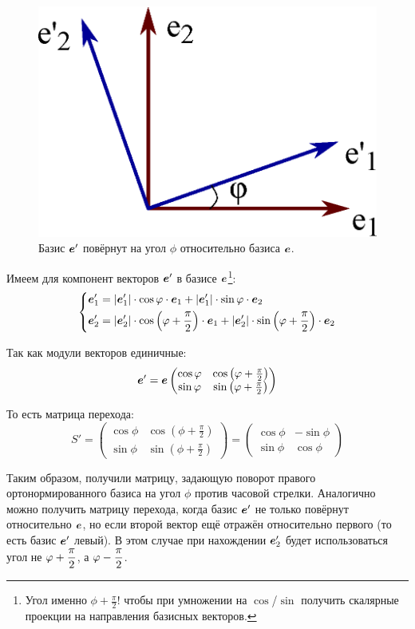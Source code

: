 \documentclass[a4paper,12pt]{article}
\begin{document}
  \begin{figure}[h]
    \centering
    
    \includegraphics[width=0.4\columnwidth]{turned-ortonorm-basis}
    
    \caption{Базис $\boldsymbol e'$ повёрнут на угол $\phi$ относительно базиса $\boldsymbol e$.}
    \label{fig:turned-ortonorm-basis}
  \end{figure}
  
  Имеем для компонент векторов $\boldsymbol e'$ в базисе $\boldsymbol e$\footnote{Угол именно $\phi + \frac{\pi}{2}$! чтобы при умножении на $\cos$/$\sin$ получить скалярные проекции на направления базисных векторов.}:
  \[
    \left\{
      \begin{aligned}
        &\boldsymbol e_1' = |\boldsymbol e_1'| \cdot \cos\varphi \cdot \boldsymbol e_1 + |\boldsymbol e_1'| \cdot \sin\varphi \cdot \boldsymbol e_2\\
        &\boldsymbol e_2' = |\boldsymbol e_2'| \cdot \cos{\left(\varphi+ \frac{\pi}{2}\right)} \cdot \boldsymbol e_1 + |\boldsymbol e_2'| \cdot \sin{\left(\varphi+ \frac{\pi}{2}\right)} \cdot \boldsymbol e_2
      \end{aligned}
    \right.
  \]
  
  Так как модули векторов единичные:
  \[
    \boldsymbol e' = \boldsymbol e \begin{pmatrix}
      \cos\varphi & \cos{\left(\varphi+ \frac{\pi}{2}\right)}\\
      \sin\varphi & \sin{\left(\varphi+ \frac{\pi}{2}\right)}
    \end{pmatrix}
  \]
  
  То есть матрица перехода:
  \[
    S' = \begin{pmatrix}
      \cos\phi & \cos{\left(\phi + \frac{\pi}{2}\right)}\\
      \sin\phi & \sin{\left(\phi + \frac{\pi}{2}\right)}
    \end{pmatrix}
    = \begin{pmatrix}
      \cos\phi & -\sin\phi\\
      \sin\phi & \cos\phi
    \end{pmatrix}
  \]
  
  Таким образом, получили матрицу, задающую поворот правого ортонормированного базиса на угол $\phi$ против часовой стрелки.
  Аналогично можно получить матрицу перехода, когда базис $\boldsymbol e'$ не только повёрнут относительно $\boldsymbol e$, но если второй вектор ещё отражён относительно первого (то есть базис $\boldsymbol e'$ левый).
  В этом случае при нахождении $\boldsymbol e_2'$ будет использоваться угол не $\phi \hm+ \dfrac{\pi}{2}$, а $\phi \hm- \dfrac{\pi}{2}$.
  
\end{document}
